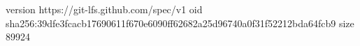 version https://git-lfs.github.com/spec/v1
oid sha256:39dfe3fcacb17690611f670e6090ff62682a25d96740a0f31f52212bda64fcb9
size 89924
